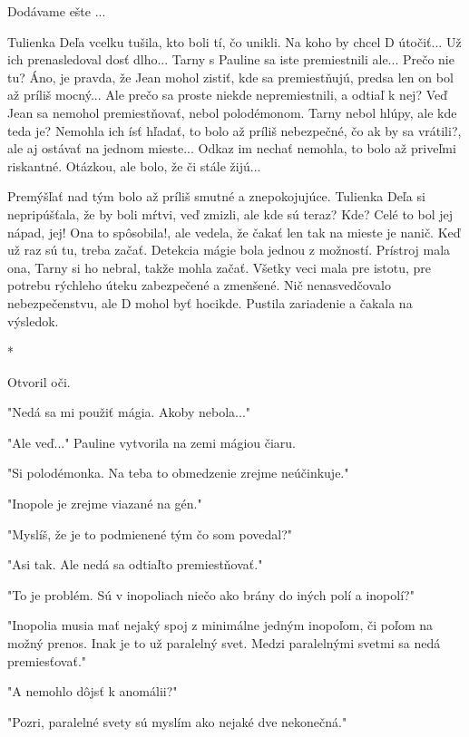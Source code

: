 \documentclass{book}
\begin{document}
Dodávame ešte ...

Tulienka Deľa vcelku tušila, kto boli tí, čo unikli. Na koho by chcel D útočiť... Už ich prenasledoval dosť dlho... Tarny s Pauline sa iste premiestnili ale... Prečo nie tu? Áno, je pravda, že Jean mohol zistiť, kde sa premiestňujú, predsa len on bol až príliš mocný... Ale prečo sa proste niekde nepremiestnili, a odtiaľ k nej? Veď Jean sa nemohol premiestňovať, nebol polodémonom. Tarny nebol hlúpy, ale kde teda je? Nemohla ich ísť hľadať, to bolo až príliš nebezpečné, čo ak by sa vrátili?, ale aj ostávať na jednom mieste... Odkaz im nechať nemohla, to bolo až priveľmi riskantné. Otázkou, ale bolo, že či stále žijú...

Premýšľať nad tým bolo až príliš smutné a znepokojujúce. Tulienka Deľa si nepripúšťala, že by boli mŕtvi, veď zmizli, ale kde sú teraz? Kde? Celé to bol jej nápad, jej! Ona to spôsobila!, ale vedela, že čakať len tak na mieste je nanič. Keď už raz sú tu, treba začať. Detekcia mágie bola jednou z možností. Prístroj mala ona, Tarny si ho nebral, takže mohla začať. Všetky veci mala pre istotu, pre potrebu rýchleho úteku zabezpečené a zmenšené. Nič nenasvedčovalo nebezpečenstvu, ale D mohol byť hocikde. Pustila zariadenie a čakala na výsledok.

\begin{center}

*

\end{center}

Otvoril oči.

"$ $Nedá sa mi použiť mágia. Akoby nebola..."$ $ 

"$ $Ale veď..."$ $  Pauline vytvorila na zemi mágiou čiaru.

"$ $Si polodémonka. Na teba to obmedzenie zrejme neúčinkuje."$ $ 

"$ $Inopole je zrejme viazané na gén."$ $ 

"$ $Myslíš, že je to podmienené tým čo som povedal?"$ $ 

"$ $Asi tak. Ale nedá sa odtiaľto premiestňovať."$ $ 

"$ $To je problém. Sú v inopoliach niečo ako brány do iných polí a inopolí?"$ $ 

"$ $Inopolia musia mať nejaký spoj z minimálne jedným inopoľom, či poľom na možný prenos. Inak je to už paralelný svet. Medzi paralelnými svetmi sa nedá premiesťovať."$ $ 

"$ $A nemohlo dôjsť k anomálii?"$ $ 

"$ $Pozri, paralelné svety sú myslím ako nejaké dve nekonečná."$ $ 
\end{document}
